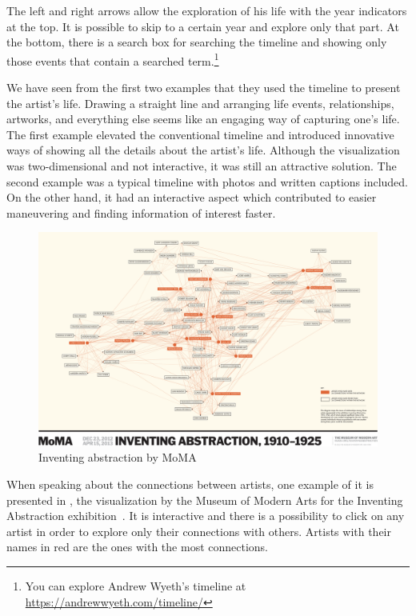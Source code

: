 The left and right arrows allow the exploration of his life with the year indicators at the top. It is possible to skip to a certain year and
explore only that part. At the bottom, there is a search box for searching the timeline and showing only those events that contain a searched
term.\footnote{You can explore Andrew Wyeth's timeline at \url{https://andrewwyeth.com/timeline/}}

We have seen from the first two examples that they used the timeline to present the artist’s life. Drawing a straight line and arranging
life events, relationships, artworks, and everything else seems like an engaging way of capturing one’s life. The first example elevated the
conventional timeline and introduced innovative ways of showing all the details about the artist’s life. Although the visualization was
two-dimensional and not interactive, it was still an attractive solution. The second example was a typical timeline with photos and written
captions included. On the other hand, it had an interactive aspect which contributed to easier maneuvering and finding information of interest
faster.

\begin{figure}[hbt!]
    \begin{center}
        \includegraphics[width=\textwidth]{graphics/2-literature-review/26}
    \end{center}
    \caption{Inventing abstraction by MoMA}
    \label{fig:figure2.26}
\end{figure}

When speaking about the connections between artists, one example of it is presented in , the visualization by the
Museum of Modern Arts for the Inventing Abstraction exhibition~\citep{moma}. It is interactive and there is a possibility to click on any
artist in order to explore only their connections with others. Artists with their names in red are the ones with the most connections.

